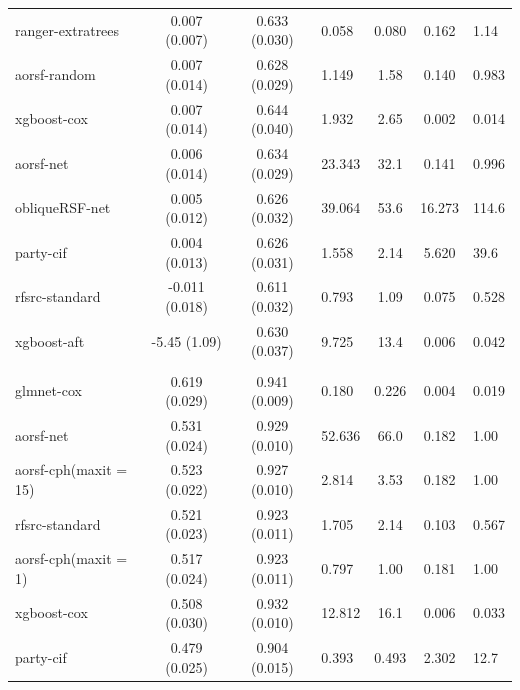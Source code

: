 \documentclass[twoside,11pt]{article}\usepackage[]{graphicx}\usepackage[]{color}
\newenvironment{knitrout}{}{} %
\begin{document}
\begin{knitrout}
\begin{longtable}{lcclccl}
\hspace{1em}ranger-extratrees & 0.007 (0.007) & 0.633 (0.030) & 0.058 & 0.080 & 0.162 & 1.14\\
\hspace{1em}aorsf-random & 0.007 (0.014) & 0.628 (0.029) & 1.149 & 1.58 & 0.140 & 0.983\\
\hspace{1em}xgboost-cox & 0.007 (0.014) & 0.644 (0.040) & 1.932 & 2.65 & 0.002 & 0.014\\
\hspace{1em}aorsf-net & 0.006 (0.014) & 0.634 (0.029) & 23.343 & 32.1 & 0.141 & 0.996\\
\hspace{1em}obliqueRSF-net & 0.005 (0.012) & 0.626 (0.032) & 39.064 & 53.6 & 16.273 & 114.6\\
\hspace{1em}party-cif & 0.004 (0.013) & 0.626 (0.031) & 1.558 & 2.14 & 5.620 & 39.6\\
\hspace{1em}rfsrc-standard & -0.011 (0.018) & 0.611 (0.032) & 0.793 & 1.09 & 0.075 & 0.528\\
\hspace{1em}xgboost-aft & -5.45 (1.09) & 0.630 (0.037) & 9.725 & 13.4 & 0.006 & 0.042\\
\addlinespace[0.3em]
\hline
\multicolumn{7}{l}{\textit{\textbf{Movies released in 2015-2018; gross 1M USD, n = 551, p = 46}}}\\
\hline
\hspace{1em}glmnet-cox & 0.619 (0.029) & 0.941 (0.009) & 0.180 & 0.226 & 0.004 & 0.019\\
\hspace{1em}aorsf-net & 0.531 (0.024) & 0.929 (0.010) & 52.636 & 66.0 & 0.182 & 1.00\\
\hspace{1em}aorsf-cph(maxit = 15) & 0.523 (0.022) & 0.927 (0.010) & 2.814 & 3.53 & 0.182 & 1.00\\
\hspace{1em}rfsrc-standard & 0.521 (0.023) & 0.923 (0.011) & 1.705 & 2.14 & 0.103 & 0.567\\
\hspace{1em}aorsf-cph(maxit = 1) & 0.517 (0.024) & 0.923 (0.011) & 0.797 & 1.00 & 0.181 & 1.00\\
\hspace{1em}xgboost-cox & 0.508 (0.030) & 0.932 (0.010) & 12.812 & 16.1 & 0.006 & 0.033\\
\hspace{1em}party-cif & 0.479 (0.025) & 0.904 (0.015) & 0.393 & 0.493 & 2.302 & 12.7\\

\end{longtable}
\end{knitrout}
\end{document}
